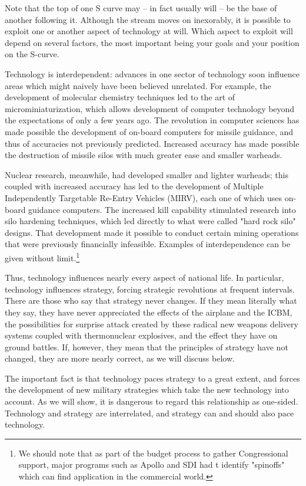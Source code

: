 Note that the top of one S curve may -- in fact usually will -- be the base of another following it. Although the stream moves on inexorably, it is possible to exploit one or another aspect of technology at will. Which aspect to exploit will depend on several factors, the most important being your goals and your position on the S-curve.

Technology is interdependent: advances in one sector of technology soon influence areas which might naively have been believed unrelated. For example, the development of molecular chemistry techniques led to the art of microminiaturization, which allows development of computer technology beyond the expectations of only a few years ago. The revolution in computer sciences has made possible the development of on-board computers for missile guidance, and thus of accuracies not previously predicted. Increased accuracy has made possible the destruction of missile silos with much greater ease and smaller warheads.

Nuclear research, meanwhile, had developed smaller and lighter warheads; this coupled with increased accuracy has led to the development of Multiple Independently Targetable Re-Entry Vehicles (MIRV), each one of which uses on-board guidance computers. The increased kill capability stimulated research into silo hardening techniques, which led directly to what were called "hard rock silo" designs. That development made it possible to conduct certain mining operations that were previously financially infeasible. Examples of interdependence can be given without limit.\footnote{We should note that as part of the budget process to gather Congressional support, major programs such as Apollo and SDI had t identify "spinoffs" which can find application in the commercial world.} 

Thus, technology influences nearly every aspect of national life. In particular, technology influences strategy, forcing strategic revolutions at frequent intervals. There are those who say that strategy never changes. If they mean literally what they say, they have never appreciated the effects of the airplane and the ICBM, the possibilities for surprise attack created by these radical new weapons delivery systems coupled with thermonuclear explosives, and the effect they have on ground battles. If, however, they mean that the principles of strategy have not changed, they are more nearly correct, as we will discuss below.

The important fact is that technology paces strategy to a great extent, and forces the development of new military strategies which take the new technology into account. As we will show, it is dangerous to regard this relationship as one-sided. Technology and strategy are interrelated, and strategy can and should also pace technology.

